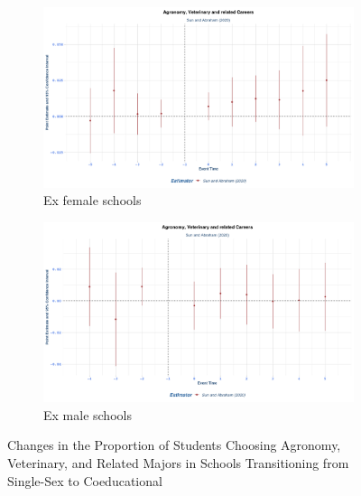  
\begin{figure}[H]
    \centering
    \begin{subfigure}[b]{0.45\textwidth}
        \centering
        \includegraphics[width=\textwidth]{Graph/Results/stagered_ex_females_AGRONOMY_VETERINARY_RELATED.png}
        \caption{Ex female schools }
        \label{fig:staggered_females_agronomy_veterinary}
    \end{subfigure}
    \hfill
    \begin{subfigure}[b]{0.45\textwidth}
        \centering
        \includegraphics[width=\textwidth]{Graph/Results/stagered_ex_males_AGRONOMY_VETERINARY_RELATED.png}
        \caption{Ex male schools}
        \label{fig:staggered_males_agronomy_veterinary}
    \end{subfigure}
       \caption{ Changes in the Proportion of Students Choosing Agronomy, Veterinary, and Related Majors in Schools Transitioning from Single-Sex to Coeducational}
    \label{fig:staggered_agronomy_veterinary}
\end{figure}


